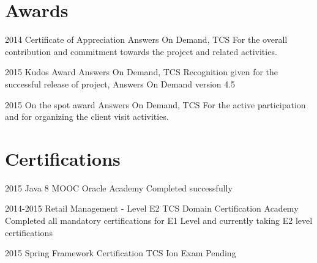 \documentclass[]{lalet-cv}
\begin{document}
\section{Awards}

\begin{entrylist}


\entry
{2014}
{Certificate of Appreciation}
{Answers On Demand, TCS}
{For the overall contribution and commitment towards the project and related activities.}

\entry
{2015}
{Kudos Award}
{Answers On Demand, TCS}
{Recognition given for the successful release of project, Answers On Demand version 4.5}

\entry
{2015}
{On the spot award}
{Answers On Demand, TCS}
{For the active participation and for organizing the client visit activities.}


\end{entrylist}
\section{Certifications}

\begin{entrylist}


\entry
{2015}
{Java 8 MOOC}
{Oracle Academy}
{Completed successfully}

\entry
{2014-2015}
{Retail Management - Level E2}
{TCS Domain Certification Academy}
{Completed all mandatory certifications for E1 Level and currently taking E2 level certifications}

\entry
{2015}
{Spring Framework Certification}
{TCS Ion}
{Exam Pending}


\end{entrylist}
\end{document}

